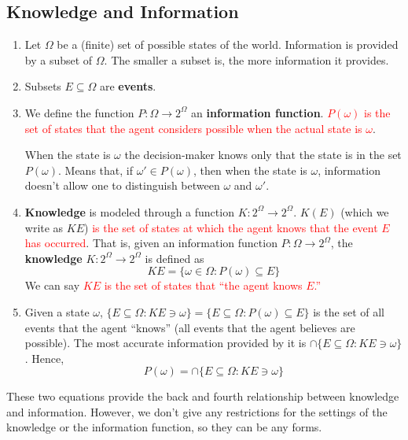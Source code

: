 \documentclass[11pt]{elegantbook_2}
\begin{document}
\subsection{Knowledge and Information}
\begin{enumerate}
    \item Let $\Omega$ be a (finite) set of possible states of the world. Information is provided by a subset of $\Omega$. The smaller a subset is, the more information it provides.
    \item Subsets $E\subseteq\Omega$ are \textbf{events}. %
    \item
    \begin{definition}
        We define the function $P : \Omega \rightarrow 2^\Omega$ an \textbf{information function}. \textcolor{red}{$P(\omega)$ is the set of states that the agent considers possible when the actual state is $\omega$}.
    \end{definition}
    When the state is $\omega$ the decision-maker knows only that the state is in the set $P(\omega)$. Means that, if $\omega' \in P(\omega)$, then when the state is $\omega$, information doesn't allow one to distinguish between $\omega$ and $\omega'$.
    \item
    \begin{definition}[Knowledge]
        \textbf{Knowledge} is modeled through a function $K:2^\Omega \rightarrow 2^\Omega$.
        $K(E)$ (which we write as $KE$) \textcolor{red}{is the set of states at which the agent knows that the event $E$ has occurred}.
        That is, given an information function $P: \Omega \rightarrow 2^\Omega$, the \textbf{knowledge} $K : 2^\Omega \rightarrow 2^\Omega$ is defined as $$KE=\{\omega\in\Omega:P(\omega)\subseteq E\}$$
        We can say \textcolor{red}{$KE$ is the set of states that ``the agent knows $E$.''}
    \end{definition}
    \item Given a state $\omega$, $\{E \subseteq \Omega : KE \ni \omega\}=\{E \subseteq \Omega : P(\omega)\subseteq E\}$ is the set of all events that the agent ``knows'' (all events that the agent believes are possible). The most accurate information provided by it is $\cap\{E \subseteq \Omega : KE \ni \omega\}$. Hence, $$P(\omega) = \cap\{E \subseteq \Omega : KE \ni \omega\}$$
\end{enumerate}
These two equations provide the back and fourth relationship between knowledge and information. However, we don't give any restrictions for the settings of the knowledge or the information function, so they can be any forms.
\end{document}
